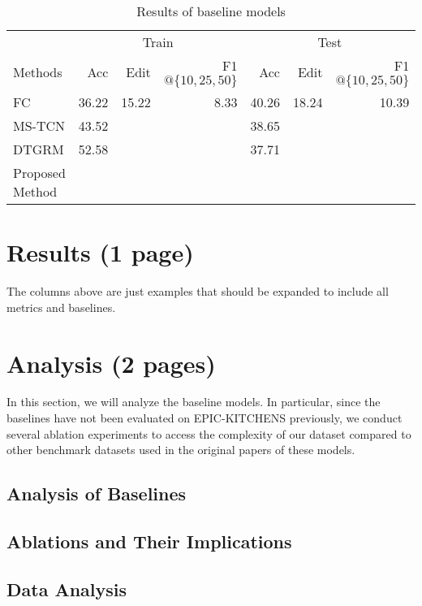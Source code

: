 \documentclass[11pt,a4paper]{article}
\begin{document}
\clearpage
\begin{table}[t]
\begin{center}
    \begin{minipage}[b]{1\textwidth}
\begin{tabular}{lrrrrrr}
\toprule
& \multicolumn{3}{c}{Train} & \multicolumn{3}{c}{Test}\\
Methods  & Acc & Edit & F1$@\{10,25,50\}$ & Acc & Edit & F1$@\{10,25,50\}$ \\
\midrule
FC  & 36.22 & 15.22 & 8.33 & 40.26 & 18.24 & 10.39\\
MS-TCN \cite{8953830} & 43.52 & & & 38.65 & & \\
DTGRM \cite{wang2020temporal} & 52.58 & & & 37.71 & & \\
\midrule
Proposed Method             & & & & \\
\bottomrule
\end{tabular}
\caption{Results of baseline models}
\label{table:results}
\end{minipage}
\end{center}
\end{table}
\section{Results (1 page)}
The columns above are just examples that should be expanded to include all metrics and baselines.

\clearpage
\section{Analysis (2 pages)}
In this section, we will analyze the baseline models. In particular, since the baselines have not been evaluated on EPIC-KITCHENS previously, we conduct several ablation experiments to access the complexity of our dataset compared to other benchmark datasets used in the original papers of these models.
\subsection{Analysis of Baselines}




\subsection{Ablations and Their Implications}










\clearpage

\begin{appendices}
\section{Data Analysis}
\label{appendix:A}


\end{appendices}
\end{document}
